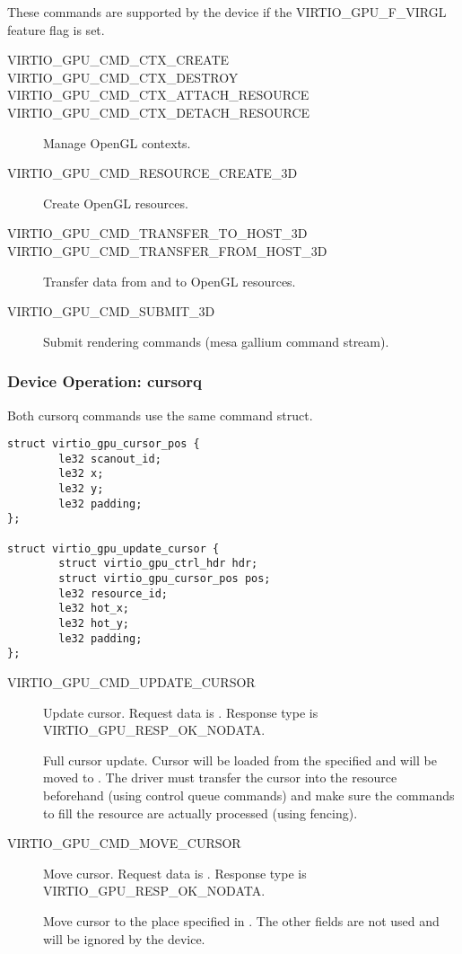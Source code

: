 These commands are supported by the device if the VIRTIO_GPU_F_VIRGL
feature flag is set.

\begin{description}

\item[VIRTIO_GPU_CMD_CTX_CREATE]
\item[VIRTIO_GPU_CMD_CTX_DESTROY]
\item[VIRTIO_GPU_CMD_CTX_ATTACH_RESOURCE]
\item[VIRTIO_GPU_CMD_CTX_DETACH_RESOURCE]
  Manage OpenGL contexts.

\item[VIRTIO_GPU_CMD_RESOURCE_CREATE_3D]
  Create OpenGL resources.

\item[VIRTIO_GPU_CMD_TRANSFER_TO_HOST_3D]
\item[VIRTIO_GPU_CMD_TRANSFER_FROM_HOST_3D]
  Transfer data from and to OpenGL resources.

\item[VIRTIO_GPU_CMD_SUBMIT_3D]
  Submit rendering commands (mesa gallium command stream).

\end{description}

\subsubsection{Device Operation: cursorq}\label{sec:Device Types / GPU Device / Device Operation / Device Operation: cursorq}

Both cursorq commands use the same command struct.

\begin{lstlisting}
struct virtio_gpu_cursor_pos {
        le32 scanout_id;
        le32 x;
        le32 y;
        le32 padding;
};

struct virtio_gpu_update_cursor {
        struct virtio_gpu_ctrl_hdr hdr;
        struct virtio_gpu_cursor_pos pos;
        le32 resource_id;
        le32 hot_x;
        le32 hot_y;
        le32 padding;
};
\end{lstlisting}

\begin{description}

\item[VIRTIO_GPU_CMD_UPDATE_CURSOR]
Update cursor.
Request data is .
Response type is VIRTIO_GPU_RESP_OK_NODATA.

Full cursor update.  Cursor will be loaded from the specified
 and will be moved to .  The driver must
transfer the cursor into the resource beforehand (using control queue
commands) and make sure the commands to fill the resource are actually
processed (using fencing).

\item[VIRTIO_GPU_CMD_MOVE_CURSOR]
Move cursor.
Request data is .
Response type is VIRTIO_GPU_RESP_OK_NODATA.

Move cursor to the place specified in .  The other fields
are not used and will be ignored by the device.

\end{description}

